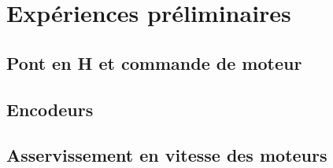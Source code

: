 
\chapter{Expériences préliminaires}

\section{Pont en H et commande de moteur}

\section{Encodeurs}

\section{Asservissement en vitesse des moteurs}